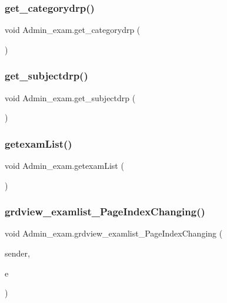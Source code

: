 \mbox{\label{class_admin__exam_afd36c9f6e379437d3b26990dc02d1bd9}} 
\subsubsection{\texorpdfstring{get\_categorydrp()}{get\_categorydrp()}}
{\footnotesize\ttfamily void Admin\+\_\+exam.\+get\+\_\+categorydrp (\begin{DoxyParamCaption}{ }\end{DoxyParamCaption})}

\mbox{\label{class_admin__exam_a890f5ce140b9b389a51cc6b4a96eec57}} 
\subsubsection{\texorpdfstring{get\_subjectdrp()}{get\_subjectdrp()}}
{\footnotesize\ttfamily void Admin\+\_\+exam.\+get\+\_\+subjectdrp (\begin{DoxyParamCaption}{ }\end{DoxyParamCaption})}

\mbox{\label{class_admin__exam_a71e7385b85f3a13a988afd28d61abd4e}} 
\subsubsection{\texorpdfstring{getexamList()}{getexamList()}}
{\footnotesize\ttfamily void Admin\+\_\+exam.\+getexam\+List (\begin{DoxyParamCaption}{ }\end{DoxyParamCaption})}

\mbox{\label{class_admin__exam_ad1a83687dce99d2051b3e576140d75cd}} 
\subsubsection{\texorpdfstring{grdview\_examlist\_PageIndexChanging()}{grdview\_examlist\_PageIndexChanging()}}
{\footnotesize\ttfamily void Admin\+\_\+exam.\+grdview\+\_\+examlist\+\_\+\+Page\+Index\+Changing (\begin{DoxyParamCaption}\item[{object}]{sender,  }\item[{Grid\+View\+Page\+Event\+Args}]{e }\end{DoxyParamCaption})\hspace{0.3cm}{\ttfamily [protected]}}

